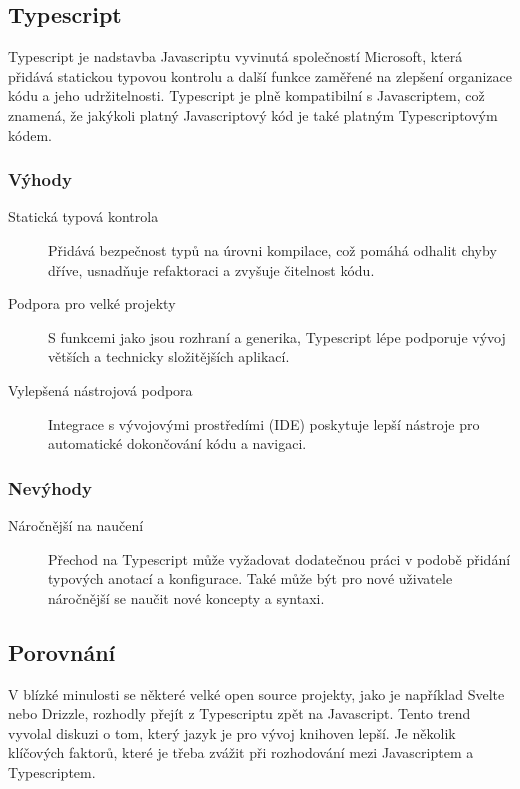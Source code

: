 \subsection{Typescript}
Typescript je nadstavba Javascriptu vyvinutá společností Microsoft, která přidává statickou typovou kontrolu a další funkce zaměřené na zlepšení organizace kódu a jeho udržitelnosti. Typescript je plně kompatibilní s Javascriptem, což znamená, že jakýkoli platný Javascriptový kód je také platným Typescriptovým kódem. \cite{Typescript}

\subsubsection{Výhody}

\begin{description}
    \item[Statická typová kontrola] Přidává bezpečnost typů na úrovni kompilace, což pomáhá odhalit chyby dříve, usnadňuje refaktoraci a zvyšuje čitelnost kódu.
    \item[Podpora pro velké projekty] S funkcemi jako jsou rozhraní a generika, Typescript lépe podporuje vývoj větších a technicky složitějších aplikací.
    \item[Vylepšená nástrojová podpora] Integrace s vývojovými prostředími (IDE) poskytuje lepší nástroje pro automatické dokončování kódu a navigaci.
\end{description}

\subsubsection{Nevýhody}

\begin{description}
    \item[Náročnější na naučení] Přechod na Typescript může vyžadovat dodatečnou práci v podobě přidání typových anotací a konfigurace. Také může být pro nové uživatele náročnější se naučit nové koncepty a syntaxi.
\end{description}

\subsection{Porovnání}
V blízké minulosti se některé velké open source projekty, jako je například Svelte nebo Drizzle, rozhodly přejít z Typescriptu zpět na Javascript. Tento trend vyvolal diskuzi o tom, který jazyk je pro vývoj knihoven lepší. Je několik klíčových faktorů, které je třeba zvážit při rozhodování mezi Javascriptem a Typescriptem.

